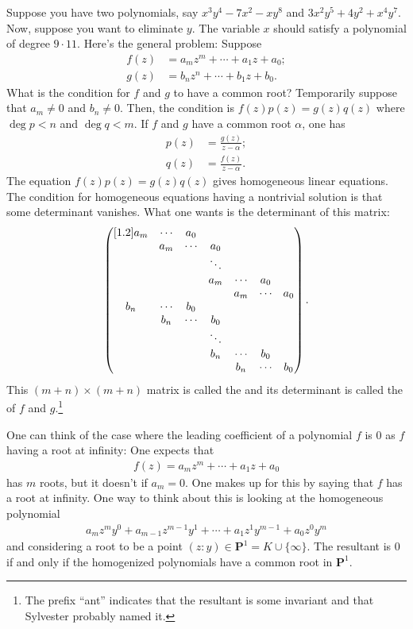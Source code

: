 \documentclass [11 pt, oneside] {article}
\begin{document}
		Suppose you have two polynomials, say $x^3y^4 - 7x^2-xy^8$ and $3x^2y^5+4y^2+x^4y^7$. Now, suppose you want to eliminate $y$. The variable $x$ should satisfy a polynomial of degree $9\cdot 11$. Here's the general problem: Suppose
		\begin{align*}
			f(z)&=a_mz^m+\cdots +  a_1z+a_0;\\
			g(z)&=b_nz^n+\cdots +  b_1z+b_0.
		\end{align*}
What is the condition for $f$ and $g$ to have a common root? Temporarily suppose that $a_m\ne 0$ and $b_n\ne 0$. Then, the condition is $f(z)p (z)=g (z)q (z)$ where $\deg p<n$ and $\deg q<m$. If $f$ and $g$ have a common root $\alpha$, one has
\begin{align*}
	p(z)&= \frac{g(z)}{z-\alpha};\\
	q(z)&= \frac{f(z)}{z-\alpha}.
\end{align*}
The equation $f(z)p (z)=g (z)q (z)$ gives homogeneous linear equations. The condition for homogeneous equations having a nontrivial solution is that some determinant vanishes. What one wants is the determinant of this matrix:
\begin{align*}
	\begin{pmatrix} [1.2] a_m & \cdots & a_0 && &&\\ & a_m & \cdots & a_0& &&\\ &&&\ddots&&&\\&&&a_m & \cdots & a_0\\&&&&a_m & \cdots & a_0\\b_n & \cdots & b_0 && &&\\ & b_n & \cdots & b_0& &&\\ &&&\ddots&&&\\&&&b_n & \cdots & b_0\\&&&&b_n & \cdots & b_0 \end{pmatrix}.
\end{align*}
This $ (m+n)\times  (m+n)$ matrix is called the  and its determinant is called the  of $f$ and $g$.\footnote{The prefix ``ant'' indicates that the resultant is some invariant and that Sylvester probably named it.}

\begin{remark}\label{ifffffffffff}
	One can think of the case where the leading coefficient of a polynomial $f$ is $0$ as $f$ having a root at infinity: One expects that
	\begin{align*}
		f(z) = a_mz^m+\cdots+a_1z+a_0
	\end{align*}
	has $m$ roots, but it doesn't if $a_m=0$. One makes up for this by saying that $f$ has a root at infinity. One way to think about this is looking at the homogeneous polynomial
	\begin{align*}
		a_mz^my^0 + a_{m-1}z^{m-1}y^1+\cdots +a_1z^1y^{m-1} +a_0z^0y^m
	\end{align*}
	and considering a root to be a point $(z:y)\in  \mathbf{P}^1 = K\cup \{\infty\}$. The resultant is $0$ if and only if the homogenized polynomials have a common root in $\mathbf{P}^1$.
\end{remark}
\end{document}
